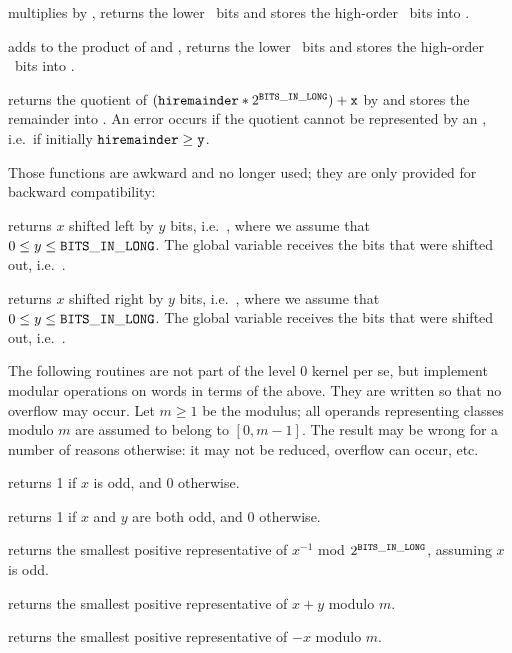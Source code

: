  multiplies  by , returns
the lower \B\ bits and stores the high-order \B\ bits into .

 adds  to the product
of  and , returns the lower \B\ bits and stores the high-order
\B\ bits into .

 returns the quotient of
$  \left({\tt hiremainder} * 2^{{\tt BITS\_IN\_LONG}}\right) + {\tt x} $
by  and stores the remainder into . An error occurs
if the quotient cannot be represented by an , i.e.~if initially
${\tt hiremainder}\ge{\tt y}$.

 Those functions are awkward and no longer used;
they are only provided for backward compatibility:

 returns $x$ shifted left by $y$ bits,
i.e.~, where we assume that $0\leq y\leq{\tt BITS\_IN\_LONG}$. The global variable
 receives the bits that were shifted out,
i.e.~.

 returns $x$ shifted right by $y$ bits,
i.e.~, where we assume that $0\leq y\leq{\tt BITS\_IN\_LONG}$. The global variable
 receives the bits that were shifted out,
i.e.~.

The following routines are not part of the level 0 kernel per se, but
implement modular operations on words in terms of the above. They are written
so that no overflow may occur. Let $m \geq 1$ be the modulus; all operands
representing classes modulo $m$ are assumed to belong to $[0,m-1]$. The
result may be wrong for a number of reasons otherwise: it may not be reduced,
overflow can occur, etc.

 returns 1 if $x$ is odd, and 0 otherwise.

 returns 1 if $x$ and $y$ are both odd,
and 0 otherwise.

 returns the smallest
positive representative of $x^{-1}$ mod $2^{\tt BITS\_IN\_LONG}$, assuming $x$ is odd.

 returns the smallest
positive representative of $x + y$ modulo $m$.

 returns the smallest
positive representative of $-x$ modulo $m$.

